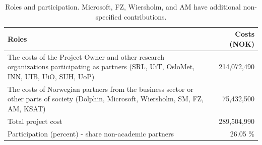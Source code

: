 \begin{table}[!t]
    \centering
    \scriptsize
    \begin{tabular}{|p{14cm}|r|} \hline
         \textbf{Roles} &  \textbf{Costs (NOK)} \\ \hline
         The costs of the Project Owner and other research organizations participating as partners (SRL, UiT, OsloMet, INN, UIB, UiO, SUH, UoP)
         & 
         214,072,490 \\ \hline
        The costs of Norwegian partners from the business sector or other parts of society (Dolphin, Microsoft, Wiersholm, SM, FZ, AM, KSAT) 
        &
        75,432,500 \\ \hline
        Total project cost 
        &
        289,504,990 \\ \hline 
        Participation (percent) - share non-academic partners
        &
        26.05 \% \\ \hline 
    \end{tabular}
    \vspace{-8pt}
    \caption{Roles and participation. Microsoft, FZ, Wiersholm, and AM have additional non-specified contributions.}\label{tab:roles-participation}
    \vspace{-15pt}
\end{table}